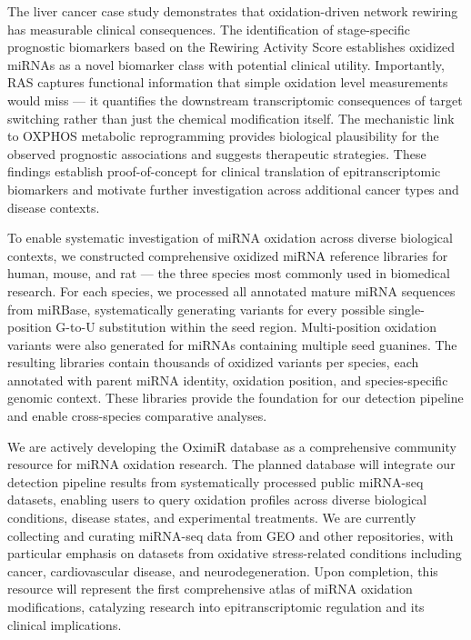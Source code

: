 The liver cancer case study demonstrates that oxidation-driven network rewiring has measurable clinical consequences. The identification of stage-specific prognostic biomarkers based on the Rewiring Activity Score establishes oxidized miRNAs as a novel biomarker class with potential clinical utility. Importantly, RAS captures functional information that simple oxidation level measurements would miss --- it quantifies the downstream transcriptomic consequences of target switching rather than just the chemical modification itself. The mechanistic link to OXPHOS metabolic reprogramming provides biological plausibility for the observed prognostic associations and suggests therapeutic strategies. These findings establish proof-of-concept for clinical translation of epitranscriptomic biomarkers and motivate further investigation across additional cancer types and disease contexts.

To enable systematic investigation of miRNA oxidation across diverse biological contexts, we constructed comprehensive oxidized miRNA reference libraries for human, mouse, and rat --- the three species most commonly used in biomedical research. For each species, we processed all annotated mature miRNA sequences from miRBase, systematically generating variants for every possible single-position G-to-U substitution within the seed region. Multi-position oxidation variants were also generated for miRNAs containing multiple seed guanines. The resulting libraries contain thousands of oxidized variants per species, each annotated with parent miRNA identity, oxidation position, and species-specific genomic context. These libraries provide the foundation for our detection pipeline and enable cross-species comparative analyses.

We are actively developing the OximiR database as a comprehensive community resource for miRNA oxidation research. The planned database will integrate our detection pipeline results from systematically processed public miRNA-seq datasets, enabling users to query oxidation profiles across diverse biological conditions, disease states, and experimental treatments. We are currently collecting and curating miRNA-seq data from GEO and other repositories, with particular emphasis on datasets from oxidative stress-related conditions including cancer, cardiovascular disease, and neurodegeneration. Upon completion, this resource will represent the first comprehensive atlas of miRNA oxidation modifications, catalyzing research into epitranscriptomic regulation and its clinical implications.
